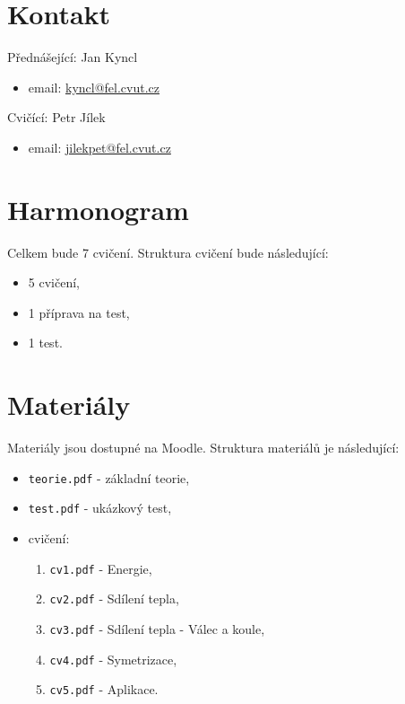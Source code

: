 \documentclass{article}
\begin{document}
\maketitle
\tableofcontents
\newpage



\section{Kontakt}
Přednášející: Jan Kyncl
\begin{itemize}
    \item email: \href{mailto:kyncl@fel.cvut.cz}{kyncl@fel.cvut.cz}
\end{itemize}

Cvičící: Petr Jílek
\begin{itemize}
    \item email: \href{mailto:jilekpet@fel.cvut.cz}{jilekpet@fel.cvut.cz}
\end{itemize}



\section{Harmonogram}
Celkem bude 7 cvičení. Struktura cvičení bude následující:
\begin{itemize}
    \item 5 cvičení,
    \item 1 příprava na test,
    \item 1 test.
\end{itemize}



\section{Materiály}
Materiály jsou dostupné na Moodle. Struktura materiálů je následující:
\begin{itemize}
    \item \texttt{teorie.pdf} - základní teorie,
    \item \texttt{test.pdf} - ukázkový test,
    \item cvičení:
          \begin{enumerate}
              \item \texttt{cv1.pdf} - Energie,
              \item \texttt{cv2.pdf} - Sdílení tepla,
              \item \texttt{cv3.pdf} - Sdílení tepla - Válec a koule,
              \item \texttt{cv4.pdf} - Symetrizace,
              \item \texttt{cv5.pdf} - Aplikace.
          \end{enumerate}
\end{itemize}
\end{document}
